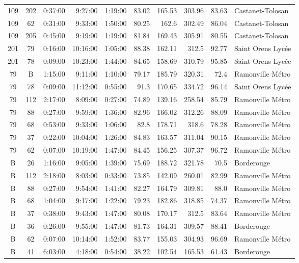 \documentclass[twoside,12pt]{article}
\begin{document}
\begin{footnotesize}
\begin{longtable}{|c|c|r|r|r|r|r|r|r|l|}
	109	&	202	&	0:37:00	&	9:27:00	&	1:19:00	&	83.02	&	165.53	&	303.96	&	83.63	&	Castanet-Tolosan	\\
	109	&	62	&	0:31:00	&	9:33:00	&	1:50:00	&	80.25	&	162.6	&	302.49	&	86.04	&	Castanet-Tolosan	\\
	109	&	205	&	0:45:00	&	9:19:00	&	1:19:00	&	81.84	&	169.43	&	305.91	&	80.55	&	Castanet-Tolosan	\\
	201	&	79	&	0:16:00	&	10:16:00	&	1:05:00	&	88.38	&	162.11	&	312.5	&	92.77	&	Saint Orens Lycée	\\
	201	&	78	&	0:09:00	&	10:23:00	&	1:44:00	&	84.65	&	158.69	&	310.79	&	95.85	&	Saint Orens Lycée	\\
	79	&	B	&	1:15:00	&	9:11:00	&	1:10:00	&	79.17	&	185.79	&	320.31	&	72.4	&	Ramonville Métro	\\
	79	&	78	&	0:09:00	&	11:12:00	&	0:55:00	&	91.3	&	170.65	&	334.72	&	96.14	&	Saint Orens Lycée	\\
	79	&	112	&	2:17:00	&	8:09:00	&	0:27:00	&	74.89	&	139.16	&	258.54	&	85.79	&	Ramonville Métro	\\
	79	&	88	&	0:27:00	&	9:59:00	&	1:36:00	&	82.96	&	166.02	&	312.26	&	88.09	&	Ramonville Métro	\\
	79	&	68	&	0:53:00	&	9:33:00	&	1:06:00	&	82.8	&	178.71	&	318.6	&	78.28	&	Ramonville Métro	\\
	79	&	37	&	0:22:00	&	10:04:00	&	1:26:00	&	84.83	&	163.57	&	311.04	&	90.15	&	Ramonville Métro	\\
	79	&	62	&	0:07:00	&	10:19:00	&	1:47:00	&	84.45	&	156.25	&	307.37	&	96.72	&	Ramonville Métro	\\
	B	&	26	&	1:16:00	&	9:05:00	&	1:39:00	&	75.69	&	188.72	&	321.78	&	70.5	&	Borderouge	\\
	B	&	112	&	2:18:00	&	8:03:00	&	0:33:00	&	73.85	&	142.09	&	260.01	&	82.99	&	Ramonville Métro	\\
	B	&	88	&	0:27:00	&	9:54:00	&	1:41:00	&	82.27	&	164.79	&	309.81	&	88.0	&	Ramonville Métro	\\
	B	&	68	&	1:04:00	&	9:17:00	&	1:22:00	&	79.23	&	182.86	&	318.85	&	74.37	&	Ramonville Métro	\\
	B	&	37	&	0:38:00	&	9:43:00	&	1:47:00	&	80.08	&	170.17	&	312.5	&	83.64	&	Ramonville Métro	\\
	B	&	36	&	0:26:00	&	9:55:00	&	1:47:00	&	81.73	&	164.31	&	309.57	&	88.41	&	Borderouge	\\
	B	&	62	&	0:07:00	&	10:14:00	&	1:52:00	&	83.77	&	155.03	&	304.93	&	96.69	&	Ramonville Métro	\\
	B	&	41	&	6:03:00	&	4:18:00	&	0:54:00	&	38.22	&	102.54	&	165.53	&	61.43	&	Borderouge	\\

\end{longtable}
\end{footnotesize}
\end{document}
